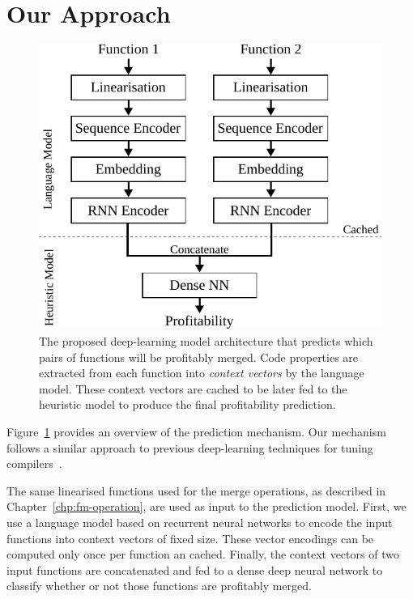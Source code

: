\section{Our Approach} \label{sec:contribution}

\begin{figure}[h]
  \centering
  \includegraphics[width=\textwidth]{figs/deeplearning-architecture.pdf}
  \caption{
      The proposed deep-learning model architecture that predicts which pairs of functions will be profitably merged. Code properties are extracted from each function into \textit{context vectors} by the language model.
      These context vectors are cached to be later fed to the heuristic model to produce the final profitability prediction.}
  \label{fig:heuristic-model-architecture}
\end{figure}

Figure~\ref{fig:heuristic-model-architecture} provides an overview of the prediction mechanism.
Our mechanism follows a similar approach to previous deep-learning techniques for tuning compilers~\cite{cummins17, mendis19}.

The same linearised functions used for the merge operations, as described in Chapter~\ref{chp:fm-operation}, are used as input to the prediction model.
First, we use a language model based on recurrent neural networks to encode the input functions into context vectors of fixed size.
These vector encodings can be computed only once per function an cached.
Finally, the context vectors of two input functions are concatenated and fed to a dense deep neural network to classify whether or not those functions are profitably merged.
